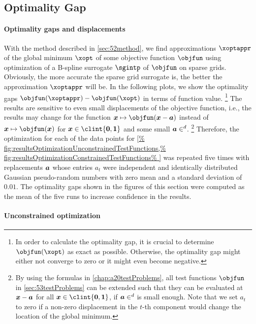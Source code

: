 \subsection{Optimality Gap}
\label{sec:542optimization}

\paragraph{Optimality gaps and displacements}

With the method described in \cref{sec:52method},
we find approximations $\xoptappr$ of the
global minimum $\xopt$ of some objective function $\objfun$
using optimization of a B-spline surrogate $\sgintp$ of $\objfun$
on sparse grids.
Obviously, the more accurate the sparse grid surrogate is,
the better the approximation $\xoptappr$ will be.
In the following plots,
we show the optimality gaps $\objfun(\xoptappr) - \objfun(\xopt)$
in terms of function value.%
\footnote{%
  In order to calculate the optimality gap,
  it is crucial to determine $\objfun(\xopt)$ as exact as possible.
  Otherwise, the optimality gap might either not converge to zero
  or it might even become negative.%
}
The results are sensitive to even small displacements
of the objective function, i.e.,
the results may change for the
function $\*x \mapsto \objfun(\*x - \*a)$
instead of $\*x \mapsto \objfun(\*x)$ for $\*x \in \clint{\*0, \*1}$
and some small $\*a \in \real^d$.%
\footnote{%
  By using the formulas in \cref{chap:a20testProblems},
  all test functions $\objfun$ in \cref{sec:53testProblems}
  can be extended such that they can be evaluated at ${\boldsymbol{x}} - {\boldsymbol{a}}$
  for all $\*x \in \clint{\*0, \*1}$, if $\*a \in \real^d$ is small enough.
  Note that we set $a_t$ to zero if a non-zero displacement in
  the $t$-th component would change the location of the global minimum.%
}
Therefore, the optimization for each of the
data points for \cref{%
  fig:resultsOptimizationUnconstrainedTestFunctions,%
  fig:resultsOptimizationConstrainedTestFunctions%
}
was repeated five times with replacements ${\boldsymbol{a}}$
whose entries $a_t$ were independent and identically distributed Gaussian
pseudo-random numbers with zero mean and a standard deviation of $0.01$.
The optimality gaps shown in the figures of this section were computed
as the mean of the five runs to increase confidence in the results.

\paragraph{Unconstrained optimization}

